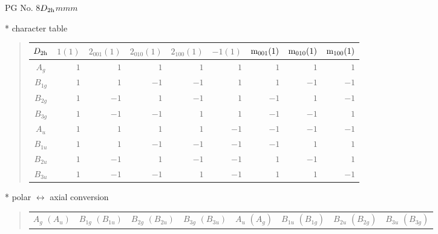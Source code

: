 \documentclass[fleqn,8pt,landscape]{jsarticle}
\begin{document}
\setcounter{MaxMatrixCols}{32}

\renewcommand{\tablename}{Table~}
\renewcommand{\figurename}{Figure~}
\begin{center}
\LARGE
PG No. 8\quad$D_{\rm 2h}$\quad$mmm$\quad[ orthorhombic ]
\end{center}

* character table
\begin{quote}
\begin{tabular}{crrrrrrrr} \hline \hline
$ D_{\rm 2h} $ & $ 1(1) $ & $ 2{}_{001}(1) $ & $ 2{}_{010}(1) $ & $ 2{}_{100}(1) $ & $ -1(1) $ & $ {\rm m}_{001}(1) $ & $ {\rm m}_{010}(1) $ & $ {\rm m}_{100}(1) $ \\ \hline
$ A_{g} $ & $ 1 $ & $ 1 $ & $ 1 $ & $ 1 $ & $ 1 $ & $ 1 $ & $ 1 $ & $ 1 $ \\
$ B_{1g} $ & $ 1 $ & $ 1 $ & $ -1 $ & $ -1 $ & $ 1 $ & $ 1 $ & $ -1 $ & $ -1 $ \\
$ B_{2g} $ & $ 1 $ & $ -1 $ & $ 1 $ & $ -1 $ & $ 1 $ & $ -1 $ & $ 1 $ & $ -1 $ \\
$ B_{3g} $ & $ 1 $ & $ -1 $ & $ -1 $ & $ 1 $ & $ 1 $ & $ -1 $ & $ -1 $ & $ 1 $ \\
$ A_{u} $ & $ 1 $ & $ 1 $ & $ 1 $ & $ 1 $ & $ -1 $ & $ -1 $ & $ -1 $ & $ -1 $ \\
$ B_{1u} $ & $ 1 $ & $ 1 $ & $ -1 $ & $ -1 $ & $ -1 $ & $ -1 $ & $ 1 $ & $ 1 $ \\
$ B_{2u} $ & $ 1 $ & $ -1 $ & $ 1 $ & $ -1 $ & $ -1 $ & $ 1 $ & $ -1 $ & $ 1 $ \\
$ B_{3u} $ & $ 1 $ & $ -1 $ & $ -1 $ & $ 1 $ & $ -1 $ & $ 1 $ & $ 1 $ & $ -1 $ \\
 \hline \hline
\end{tabular}
\end{quote}

* polar $\leftrightarrow$ axial conversion
\begin{quote}
\begin{tabular}{cccccccc}
$ A_{g}\,\,(A_{u}) $ & $ B_{1g}\,\,(B_{1u}) $ & $ B_{2g}\,\,(B_{2u}) $ & $ B_{3g}\,\,(B_{3u}) $ & $ A_{u}\,\,(A_{g}) $ & $ B_{1u}\,\,(B_{1g}) $ & $ B_{2u}\,\,(B_{2g}) $ & $ B_{3u}\,\,(B_{3g}) $
\end{tabular}
\end{quote}
\end{document}
